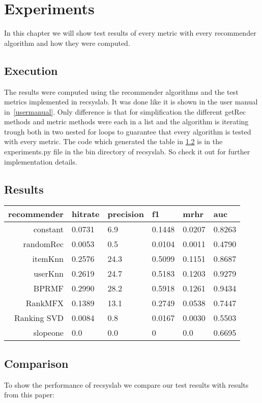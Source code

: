\chapter{Experiments}
\label{experiments}
In this chapter we will show test results of every metric with every
recommender algorithm and how they were computed.


\section{Execution}
The results were computed using the recommender algorithms and 
the test metrics implemented in recsyslab. It was done 
like it is shown in the user manual in~\ref{usermanual}.
Only difference is that for simplification the different
getRec methods and metric methods were each in a list and the 
algorithm is iterating trough both in two nested for loops
to guarantee that every algorithm is tested with every metric.
The code which generated the table in \ref{results} is in 
the experiments.py file in the bin directory of recsyslab.
So check it out for further implementation details.


\section{Results}
\label{results}

\begin{tabular}{rlllll} \toprule
    recommender  & hitrate & precision & f1 & mrhr & auc \\ \midrule
    constant & 0.0731 & 6.9 & 0.1448 & 0.0207 & 0.8263 \\
    randomRec & 0.0053 & 0.5 & 0.0104 & 0.0011 & 0.4790 \\
    itemKnn & 0.2576 & 24.3 & 0.5099 & 0.1151 & 0.8687 \\
    userKnn & 0.2619 & 24.7 & 0.5183 & 0.1203 & 0.9279 \\
    BPRMF& 0.2990 & 28.2 & 0.5918 & 0.1261 & 0.9434 \\
    RankMFX & 0.1389 & 13.1 & 0.2749 & 0.0538 & 0.7447 \\
    Ranking SVD & 0.0084 & 0.8 & 0.0167 & 0.0030 & 0.5503 \\
    slopeone & 0.0 & 0.0 & 0 & 0.0 & 0.6695 \\ \bottomrule
\end{tabular}

\section{Comparison}
To show the performance of recsyslab we compare our test results with results 
from this paper:~\cite{deshpande2004item}


